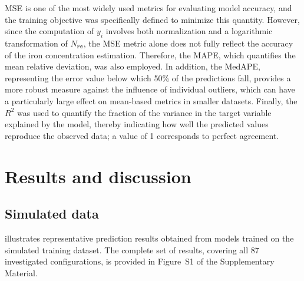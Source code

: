 \documentclass[10pt]{iopart}
\begin{document}
MSE is one of the most widely used metrics for evaluating model accuracy,
and the training objective was specifically defined to minimize this quantity.
However, since the computation of $y_i$ involves both normalization and a logarithmic transformation of $N_\mathtt{Fe}$,
the MSE metric alone does not fully reflect the accuracy of the iron concentration estimation.
Therefore, the MAPE, which quantifies the mean relative deviation, was also employed.
In addition, the MedAPE, representing the error value below which 50\% of the predictions fall,
provides a more robust measure against the influence of individual outliers,
which can have a particularly large effect on mean-based metrics in smaller datasets.
Finally, the $R^2$ was used to quantify the fraction of the variance in the
target variable explained by the model,
thereby indicating how well the predicted values reproduce the observed data;
a value of 1 corresponds to perfect agreement.


\section{Results and discussion}\label{sec:Rez}
\subsection{Simulated data}

 illustrates representative prediction results obtained from models trained on the simulated training dataset.
The complete set of results, covering all 87 investigated configurations, is provided in Figure~S1 of the Supplementary Material.

\end{document}
